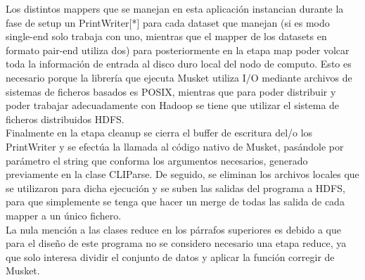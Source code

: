 \documentclass[conference]{IEEEtran}
\begin{document}
Los distintos mappers que se manejan en esta aplicación instancian durante la fase de setup un PrintWriter[*] para cada dataset que manejan (si es modo single-end solo trabaja con uno, mientras que el mapper de los datasets en formato pair-end utiliza dos) para posteriormente en la etapa map poder volcar toda la información de entrada al disco duro local del nodo de computo. Esto es necesario porque la librería que ejecuta Musket utiliza I/O mediante archivos de sistemas de ficheros basados es POSIX, mientras que para poder distribuir y poder trabajar adecuadamente con Hadoop se tiene que utilizar el sistema de ficheros distribuidos HDFS.\\
Finalmente en la etapa cleanup se cierra el buffer de escritura del/o los PrintWriter y se efectúa la llamada al código nativo de Musket, pasándole por parámetro el string que conforma los argumentos necesarios, generado previamente en la clase CLIParse. De seguido, se eliminan los archivos locales que se utilizaron para dicha ejecución y se suben las salidas del programa a HDFS, para que simplemente se tenga que hacer un merge de todas las salida de cada mapper a un único fichero.\\

La nula mención a las clases reduce en los párrafos superiores es debido a que para el diseño de este programa no se considero necesario una etapa reduce, ya que solo interesa dividir el conjunto de datos y aplicar la función corregir de Musket.

\end{document}
